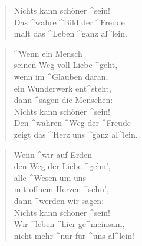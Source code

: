 \documentclass{leadsheet}
\begin{document}
\begin{song}
\begin{multicols}{2}
\begin{verse}
  Nichts kann schöner ^sein! \\
  Das ^wahre ^Bild der ^Freude \\
  malt das ^Leben ^ganz al^lein. \\
  \end{verse}
  \begin{chorus}[after-label=]\end{chorus}
  \begin{verse}
  ^Wenn ein Mensch \\
  seinen Weg voll Liebe ^geht, \\
  wenn im ^Glauben daran, \\
  ein Wunderwerk ent^steht, \\
  dann ^sagen die Menschen: \\
  Nichts kann schöner ^sein! \\
  Den ^wahren ^Weg der ^Freude \\
  zeigt das ^Herz uns ^ganz al^lein. \\
  \end{verse}
  \begin{chorus}[after-label=]\end{chorus}
  \begin{verse}
  Wenn ^wir auf Erden \\
  den Weg der Liebe ^gehn', \\
  alle ^Wesen um uns \\
  mit offnem Herzen ^sehn', \\
  dann ^werden wir sagen: \\
  Nichts kann schöner ^sein! \\
  Wir ^leben ^hier ge^meinsam, \\
  nicht mehr ^nur für ^uns al^lein!  \\ 
  \end{verse}
  \begin{chorus}[after-label=]\end{chorus}
  \end{multicols}
\end{song}
\end{document}

